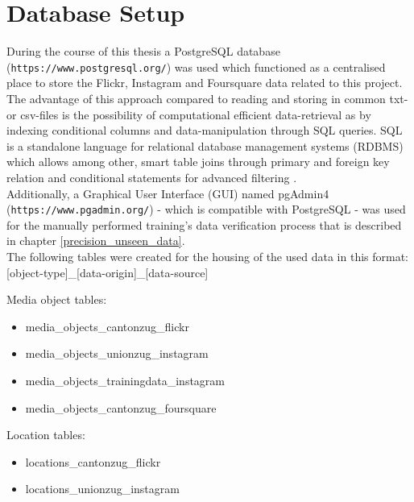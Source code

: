 \section{Database Setup} \label{database_setup}
During the course of this thesis a PostgreSQL database (\texttt{https://www.postgresql.org/}) was used which functioned as a centralised place to store the Flickr, Instagram and Foursquare data related to this project. The advantage of this approach compared to reading and storing in common txt- or csv-files is the possibility of computational efficient data-retrieval as by indexing conditional columns and data-manipulation through SQL queries. SQL is a standalone language for relational database management systems (RDBMS) which allows among other, smart table joins through primary and foreign key relation and conditional statements for advanced filtering \parencite{PostgreSQL2019}.\\
Additionally, a Graphical User Interface (GUI) named pgAdmin4 (\texttt{https://www.pgadmin.org/}) - which is compatible with PostgreSQL - was used for the manually performed training's data verification process that is described in chapter \ref{precision_unseen_data}.\\
The following tables were created for the housing of the used data in this format: [object-type]\_[data-origin]\_[data-source] \\
\newline

Media object tables:\\
\begin{itemize}
    \item media\_objects\_cantonzug\_flickr
    \item media\_objects\_unionzug\_instagram
    \item media\_objects\_trainingdata\_instagram
    \item media\_objects\_cantonzug\_foursquare
\end{itemize}

Location tables:\\
\begin{itemize}
    \item locations\_cantonzug\_flickr
    \item locations\_unionzug\_instagram
\end{itemize}

